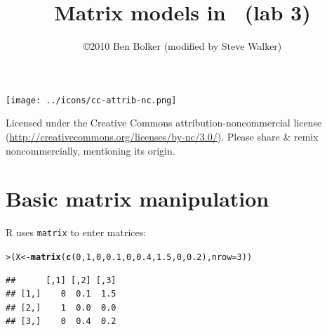 \documentclass[11pt]{article}\usepackage[]{graphicx}\usepackage[]{color}
\title{Matrix models in \R\ (lab 3)}
\author{\copyright 2010 Ben Bolker (modified by Steve Walker)}
\makeatletter
\newcommand{\hlnum}[1]{\textcolor[rgb]{0.686,0.059,0.569}{#1}}%
\newcommand{\hlstd}[1]{\textcolor[rgb]{0.345,0.345,0.345}{#1}}%
\newcommand{\hlkwb}[1]{\textcolor[rgb]{0.69,0.353,0.396}{#1}}%
\newcommand{\hlkwc}[1]{\textcolor[rgb]{0.333,0.667,0.333}{#1}}%
\newcommand{\hlkwd}[1]{\textcolor[rgb]{0.737,0.353,0.396}{\textbf{#1}}}%
\newenvironment{kframe}{%
 \def\at@end@of@kframe{}%
 \ifinner\ifhmode%
  \def\at@end@of@kframe{\end{minipage}}%
  \begin{minipage}{\columnwidth}%
 \fi\fi%
 \def\FrameCommand##1{\hskip\@totalleftmargin \hskip-\fboxsep
 \colorbox{shadecolor}{##1}\hskip-\fboxsep
     \hskip-\linewidth \hskip-\@totalleftmargin \hskip\columnwidth}%
 \MakeFramed {\advance\hsize-\width
   \@totalleftmargin\z@ \linewidth\hsize
   \@setminipage}}%
 {\par\unskip\endMakeFramed%
 \at@end@of@kframe}
\newenvironment{knitrout}{}{} %
\newcommand{\code}[1]{{\tt #1}}
\numberwithin{exercise}{section}
\makeatother
\begin{document}
\maketitle

\texttt{[image: ../icons/cc-attrib-nc.png]}

\begin{minipage}[b]{3in}
{\small Licensed under the Creative Commons 
  attribution-noncommercial license
(\url{http://creativecommons.org/licenses/by-nc/3.0/}).
Please share \& remix noncommercially,
mentioning its origin.}
\end{minipage}







\section{Basic matrix manipulation}

R uses \code{matrix} to enter matrices:

\begin{knitrout}
\color{fgcolor}\begin{kframe}
\begin{alltt}
\hlstd{> }\hlstd{(X} \hlkwb{<-} \hlkwd{matrix}\hlstd{(}\hlkwd{c}\hlstd{(}\hlnum{0}\hlstd{,} \hlnum{1}\hlstd{,} \hlnum{0}\hlstd{,} \hlnum{0.1}\hlstd{,} \hlnum{0}\hlstd{,} \hlnum{0.4}\hlstd{,} \hlnum{1.5}\hlstd{,} \hlnum{0}\hlstd{,} \hlnum{0.2}\hlstd{),} \hlkwc{nrow} \hlstd{=} \hlnum{3}\hlstd{))}
\end{alltt}
\begin{verbatim}
##      [,1] [,2] [,3]
## [1,]    0  0.1  1.5
## [2,]    1  0.0  0.0
## [3,]    0  0.4  0.2
\end{verbatim}
\end{kframe}
\end{knitrout}
\end{document}
